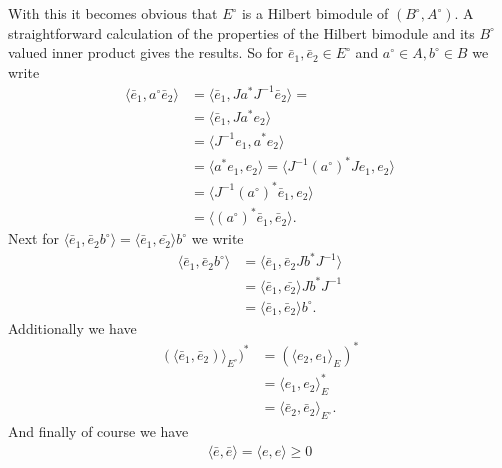 With this it becomes obvious that $E^\circ$ is a Hilbert bimodule
of $(B^{\circ}, A^{\circ})$. A straightforward calculation of the properties of the Hilbert bimodule and its $B^{\circ}$
valued inner product gives the results. So for $\bar{e}_1, \bar{e}_2 \in E^{\circ}$ and $a^\circ \in A,
b^\circ \in B$ we write
\begin{align}
    \langle\bar{e}_1, a^\circ \bar{e}_2\rangle &= \langle\bar{e}_1, Ja^*J^{-1}
    \bar{e}_2\rangle=\nonumber\\
    &= \langle\bar{e}_1 , J a^* e_2\rangle \nonumber \\
    &= \langle J^{-1} e_1, a^* e_2\rangle \nonumber\\
    & = \langle a^* e_1, e_2\rangle= \langle J^{-1}(a^\circ)^* J e_1, e_2\rangle  \nonumber\\
    & = \langle J^{-1} (a^\circ)^* \bar{e}_1, e_2\rangle \nonumber\\
    & = \langle (a^\circ)^* \bar{e}_1 , \bar{e}_2\rangle.
\end{align}
Next for $\langle\bar{e}_1, \bar{e}_2 b^\circ\rangle = \langle\bar{e}_1,
\bar{e_2}\rangle b^\circ$ we write
\begin{align}
    \langle\bar{e}_1, \bar{e}_2 b^\circ\rangle  &= \langle\bar{e}_1, \bar{e}_2 Jb^*J^{-1}\rangle
    \nonumber\\
    &= \langle\bar{e}_1, \bar{e_2}\rangle Jb^*J^{-1} \nonumber \\
    &= \langle\bar{e}_1, \bar{e}_2\rangle b^\circ.
\end{align}
Additionally we have
\begin{align}
    (\langle\bar{e}_1, \bar{e}_2)\rangle_{E^\circ})^* &= (\langle e_2, e_1\rangle_E)^*\nonumber\\
                                          &= \langle e_1, e_2\rangle_E^* \nonumber\\
                                          &= \langle\bar{e}_2, \bar{e}_2\rangle_{E^\circ}.
\end{align}
And finally of course we have
\begin{align}
    \langle\bar{e}, \bar{e}\rangle = \langle e, e\rangle \geq 0
\end{align}

